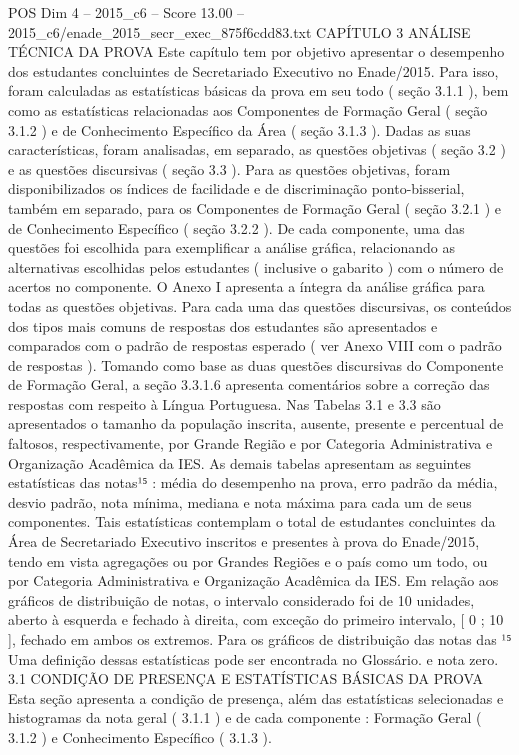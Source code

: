\begin{textsample}{POS Dim 4 – 2015\_c6 – Score 13.00 – 2015\_c6/enade\_2015\_secr\_exec\_875f6cdd83.txt}  \label{ex:f4_pos_026}
CAPÍTULO 3 ANÁLISE TÉCNICA DA PROVA Este capítulo tem por objetivo apresentar o desempenho dos estudantes concluintes de Secretariado Executivo no Enade/2015.
Para isso, foram calculadas as estatísticas básicas da prova em seu todo ( seção 3.1.1 ), bem como as estatísticas relacionadas aos Componentes de Formação Geral ( seção 3.1.2 ) e de Conhecimento Específico da Área ( seção 3.1.3 ).
Dadas as suas características, foram analisadas, em separado, as questões objetivas ( seção 3.2 ) e as questões discursivas ( seção 3.3 ).
Para as questões objetivas, foram disponibilizados os índices de facilidade e de discriminação ponto-bisserial, também em separado, para os Componentes de Formação Geral ( seção 3.2.1 ) e de Conhecimento Específico ( seção 3.2.2 ).
De cada componente, uma das questões foi escolhida para exemplificar a análise gráfica, relacionando as alternativas escolhidas pelos estudantes ( inclusive o gabarito ) com o número de acertos no componente.
O Anexo I apresenta a íntegra da análise gráfica para todas as questões objetivas.
Para cada uma das questões discursivas, os conteúdos dos tipos mais comuns de respostas dos estudantes são apresentados e comparados com o padrão de respostas esperado ( ver Anexo VIII com o padrão de respostas ).
Tomando como base as duas questões discursivas do Componente de Formação Geral, a seção 3.3.1.6 apresenta comentários sobre a correção das respostas com respeito à Língua Portuguesa.
Nas Tabelas 3.1 e 3.3 são apresentados o tamanho da população inscrita, ausente, presente e percentual de faltosos, respectivamente, por Grande Região e por Categoria Administrativa e Organização Acadêmica da IES.
As demais tabelas apresentam as seguintes estatísticas das notas¹⁵ : média do desempenho na prova, erro padrão da média, desvio padrão, nota mínima, mediana e nota máxima para cada um de seus componentes.
Tais estatísticas contemplam o total de estudantes concluintes da Área de Secretariado Executivo inscritos e presentes à prova do Enade/2015, tendo em vista agregações ou por Grandes Regiões e o país como um todo, ou por Categoria Administrativa e Organização Acadêmica da IES.
Em relação aos gráficos de distribuição de notas, o intervalo considerado foi de 10 unidades, aberto à esquerda e fechado à direita, com exceção do primeiro intervalo, [ 0 ; 10 ], fechado em ambos os extremos.
Para os gráficos de distribuição das notas das ¹⁵ Uma definição dessas estatísticas pode ser encontrada no Glossário. e nota zero. 3.1 CONDIÇÃO DE PRESENÇA E ESTATÍSTICAS BÁSICAS DA PROVA Esta seção apresenta a condição de presença, além das estatísticas selecionadas e histogramas da nota geral ( 3.1.1 ) e de cada componente : Formação Geral ( 3.1.2 ) e Conhecimento Específico ( 3.1.3 ).

\end{textsample}
